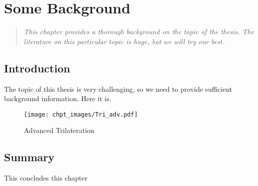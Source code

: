 \chapter{Some Background}\label{Background_1_chapter}
\begin{quote}
{\it This chapter provides a thorough background on the topic of the thesis. The literature on this particular topic is huge, but we will try our best.}
\end{quote}

\section{Introduction}\label{Intro_2}
The topic of this thesis is very challenging, so we need to provide sufficient background information. Here it is.
\begin{figure}[!h]
	\centering
	\texttt{[image: chpt\_images/Tri\_adv.pdf]}
	\caption{Advanced Trilateration}
	\label{Trilateration}
\end{figure}

\section{Summary}
This concludes this chapter